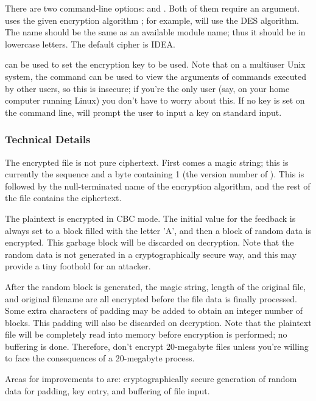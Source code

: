 \documentclass{howto}
\begin{document}
There are two command-line options:  and
.  Both of them require an argument.   uses the given encryption algorithm
; for example,  will use the DES
algorithm.  The name should be the same as an available module name;
thus it should be in lowercase letters.  The default cipher is IDEA.

 can be used to set the encryption key to be used.
Note that on a multiuser Unix system, the  command can be
used to view the arguments of commands executed by other users, so
this is insecure; if you're the only user (say, on your home computer
running Linux) you don't have to worry about this.  If no key is set
on the command line,  will prompt the user to input a key
on standard input.


\subsubsection{Technical Details}

The encrypted file is not pure ciphertext.  First comes a magic
string; this is currently the sequence  and a byte
containing 1 (the version number of ).
This is followed by the null-terminated name of the encryption
algorithm, and the rest of the file contains the ciphertext.  

The plaintext is encrypted in CBC mode.  The initial value for the
feedback is always set to a block filled with the letter 'A', and then
a block of random data is encrypted.  This garbage block will be
discarded on decryption.  Note that the random data is not generated
in a cryptographically secure way, and this may provide a tiny foothold for
an attacker.

After the random block is generated, the magic string, length of the
original file, and original filename are all encrypted before the file
data is finally processed.  Some extra characters of padding may be
added to obtain an integer number of blocks.  This padding will also
be discarded on decryption.  Note that the plaintext file will be
completely read into memory before encryption is performed; no
buffering is done.  Therefore, don't encrypt 20-megabyte files unless
you're willing to face the consequences of a 20-megabyte process.

Areas for improvements to  are: cryptographically secure
generation of random data for padding, key entry, and buffering of
file input.
\end{document}
